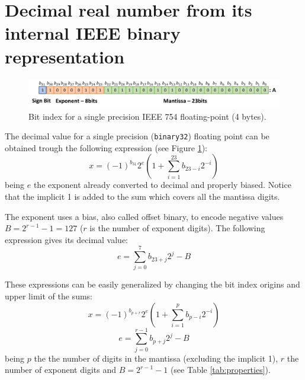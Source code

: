     \section{Decimal real number from its internal IEEE binary representation}


\FloatBarrier 
\begin{figure}[H]
    \centering
    \includegraphics[width= \textwidth]{./doc/Figures/singlebits.png}
    \caption{Bit index for a single precision IEEE 754 floating-point (4 bytes).}
    \label{fig:singlebits}
\end{figure}

The decimal value for a single precision (\texttt{binary32}) floating point can be obtained trough the following expression (see Figure \ref{fig:singlebits}):
$$
   x = (-1)^{b_{31}}  2^e \left( 1 +   \sum_{i=1}^{23} b_{23-i} 2^{-i}    \right) 
$$
being $e$ the exponent already converted to decimal and properly biased. 
Notice that the implicit 1 is added to the sum which covers all the mantissa digits. 

The exponent uses a bias, also called  offset binary, to encode negative values $B = 2^{r-1} - 1 = 127$ ($r$ is the number of exponent digits). 
The following expression gives its decimal value:
$$
e = \sum_{j=0}^{7} b_{23+j} 2^j - B
$$
 

% 
 
\begin{IN}
    These expressions can be easily generalized by changing the bit index origins and upper limit of the sums:
    $$
    x = (-1)^{b_{p+r}}  2^e \left( 1 +   \sum_{i=1}^{p} b_{p-i} 2^{-i}    \right) 
    $$
    $$
    e = \sum_{j=0}^{r-1} b_{p+j} 2^j - B
    $$
    being $p$ the the number of digits in the mantissa (excluding the implicit 1), $r$ the number of exponent digits and $B = 2^{r-1} - 1$ (see Table \ref{tab:properties}).   
\end{IN}




